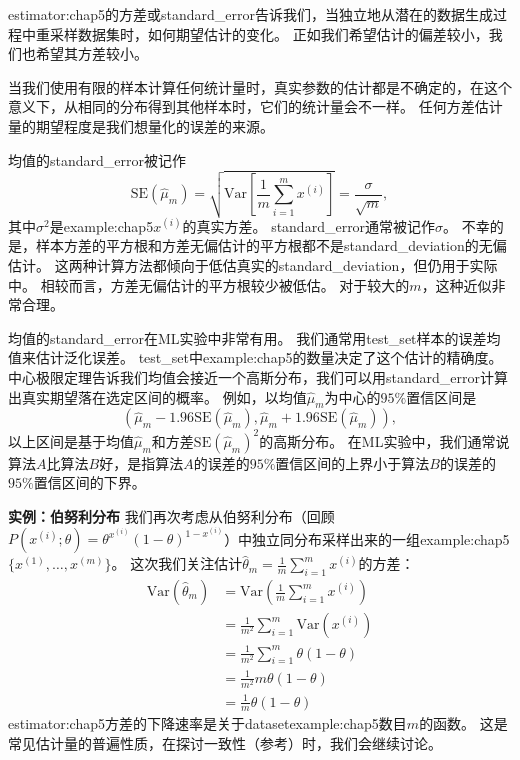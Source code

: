 \gls{estimator:chap5}的方差或\gls{standard_error}告诉我们，当独立地从潜在的数据生成过程中重采样数据集时，如何期望估计的变化。
正如我们希望估计的偏差较小，我们也希望其方差较小。

当我们使用有限的样本计算任何统计量时，真实参数的估计都是不确定的，在这个意义下，从相同的分布得到其他样本时，它们的统计量会不一样。
任何方差估计量的期望程度是我们想量化的误差的来源。

均值的\gls{standard_error}被记作
\begin{equation}
\label{eq:5.46}
    \text{SE}(\hat{\mu}_m) = \sqrt{ \text{Var} \left[ \frac{1}{m} \sum_{i=1}^m x^{(i)} \right] } = \frac{\sigma}{\sqrt{m}},
\end{equation}
其中$\sigma^2$是\gls{example:chap5}$x^{(i)}$的真实方差。
\gls{standard_error}通常被记作$\sigma$。
不幸的是，样本方差的平方根和方差无偏估计的平方根都不是\gls{standard_deviation}的无偏估计。
这两种计算方法都倾向于低估真实的\gls{standard_deviation}，但仍用于实际中。
相较而言，方差无偏估计的平方根较少被低估。
对于较大的$m$，这种近似非常合理。


均值的\gls{standard_error}在\gls{ML}实验中非常有用。
我们通常用\gls{test_set}样本的误差均值来估计泛化误差。
\gls{test_set}中\gls{example:chap5}的数量决定了这个估计的精确度。
中心极限定理告诉我们均值会接近一个高斯分布，我们可以用\gls{standard_error}计算出真实期望落在选定区间的概率。
例如，以均值$\hat{\mu}_m$为中心的$95\%$置信区间是
\begin{equation}
    ( \hat{\mu}_m - 1.96\text{SE}(\hat{\mu}_m), \hat{\mu}_m + 1.96 \text{SE}(\hat{\mu}_m) ),
\end{equation}
以上区间是基于均值$\hat{\mu}_m$和方差$\text{SE}(\hat{\mu}_m)^2$的高斯分布。
在\gls{ML}实验中，我们通常说算法$A$比算法$B$好，是指算法$A$的误差的$95\%$置信区间的上界小于算法$B$的误差的$95\%$置信区间的下界。

\textbf{实例：伯努利分布} \quad 我们再次考虑从伯努利分布（回顾$P(x^{(i)}; \theta) = \theta^{x^{(i)}} (1-\theta)^{1 - x^{(i)}}$）中独立同分布采样出来的一组\gls{example:chap5}$\{ x^{(1)}, \dots, x^{(m)} \}$。
这次我们关注估计$\hat{\theta}_m = \frac{1}{m} \sum_{i=1}^m x^{(i)}$的方差：
\begin{align}
    \text{Var}\left( \hat{\theta}_m \right) &= \text{Var}\left( \frac{1}{m} \sum_{i=1}^m x^{(i)} \right) \\
    &= \frac{1}{m^2} \sum_{i=1}^m \text{Var} \left( x^{(i)} \right) \\
    &= \frac{1}{m^2} \sum_{i=1}^m \theta (1 - \theta) \\
    &= \frac{1}{m^2} m\theta(1-\theta) \\
    &= \frac{1}{m} \theta(1-\theta)
\end{align} 
\gls{estimator:chap5}方差的下降速率是关于\gls{dataset}\gls{example:chap5}数目$m$的函数。
这是常见估计量的普遍性质，在探讨一致性（参考）时，我们会继续讨论。


